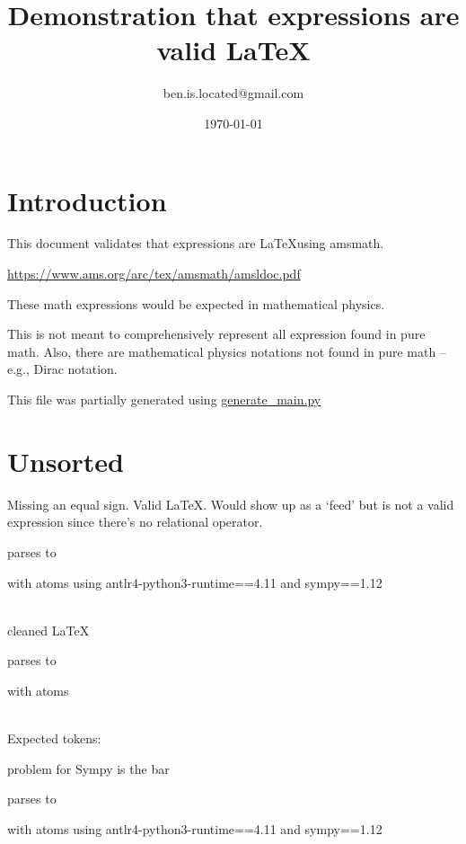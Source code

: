 \documentclass{article}
\title{Demonstration that expressions are valid \LaTeX}
\author{ben.is.located@gmail.com}
\date{\today}
\begin{document}
\maketitle

\section{Introduction}
This document validates that expressions are \LaTeX using amsmath. 

\href{https://www.ams.org/arc/tex/amsmath/amsldoc.pdf}{https://www.ams.org/arc/tex/amsmath/amsldoc.pdf}

These math expressions would be expected in mathematical physics.

This is not meant to comprehensively represent all expression found in pure math. Also, there are mathematical physics notations not found in pure math -- e.g., Dirac notation.

This file was partially generated using
\href{https://github.com/allofphysicsgraph/latex-example-expressions/blob/master/generate_main.py}{generate\_main.py}

\section{Unsorted}

Missing an equal sign. Valid \LaTeX. Would show up as a `feed' but is not a valid expression since there's no relational operator.

parses to

with atoms
using antlr4-python3-runtime==4.11 and sympy==1.12

\ \\
cleaned \LaTeX

parses to

with atoms


\ \\
Expected tokens:



\hrulefill

problem for Sympy is the bar

parses to

with atoms
using antlr4-python3-runtime==4.11 and sympy==1.12
\end{document}

